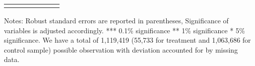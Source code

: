 \begin{sidewaystable}[!htbp]
{\begin{threeparttable}
\begin{tabular}{@{\extracolsep{5pt}}lD{.}{.}{-3} D{.}{.}{-3} D{.}{.}{-3} D{.}{.}{-3} D{.}{.}{-3} D{.}{.}{-3} }
\bottomrule \\[-1.8ex] 

\end{tabular}%

\begin{tablenotes}
  \LARGE
      Notes: Robust standard errors are reported in parentheses, Significance of variables is adjusted accordingly. *** 0.1\% significance ** 1\% significance * 5\% significance. We have a total of 1,119,419 (55,733 for treatment and 1,063,686 for control sample) possible observation with deviation accounted for by missing data.
\end{tablenotes}    



\end{threeparttable}
}
\end{sidewaystable} 